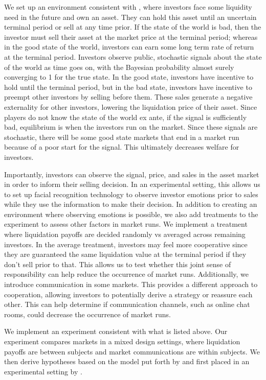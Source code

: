 \documentclass[11pt]{article}
\begin{document}
We set up an environment consistent with \cite{bernardo2004liquidity}, where investors face some liquidity need in the future and own an asset. They can hold this asset until an uncertain terminal period or sell at any time prior. If the state of the world is bad, then the investor must sell their asset at the market price at the terminal period; whereas in the good state of the world, investors can earn some long term rate of return at the terminal period. Investors observe public, stochastic signals about the state of the world as time goes on, with the Bayesian probability almost surely converging to 1 for the true state. In the good state, investors have incentive to hold until the terminal period, but in the bad state, investors have incentive to preempt other investors by selling before them. These sales generate a negative externality for other investors, lowering the liquidation price of their asset. Since players do not know the state of the world ex ante, if the signal is sufficiently bad, equilibrium is when the investors run on the market. Since these signals are stochastic, there will be some good state markets that end in a market run because of a poor start for the signal. This ultimately decreases welfare for investors. %

Importantly, investors can observe the signal, price, and sales in the asset market in order to inform their selling decision. In an experimental setting, this allows us to set up facial recognition technology to observe investor emotions prior to sales while they use the information to make their decision. In addition to creating an environment where observing emotions is possible, we also add treatments to the experiment to assess other factors in market runs. We implement a treatment where liquidation payoffs are decided randomly vs averaged across remaining investors. In the average treatment, investors may feel more cooperative since they are guaranteed the same liquidation value at the terminal period if they don't sell prior to that. This allows us to test whether this joint sense of responsibility can help reduce the occurrence of market runs. Additionally, we introduce communication in some markets. This provides a different approach to cooperation, allowing investors to potentially derive a strategy or reassure each other. This can help determine if communication channels, such as online chat rooms, could decrease the occurrence of market runs.

We implement an experiment consistent with what is listed above. Our experiment compares markets in a mixed design settings, where liquidation payoffs are between subjects and market communications are within subjects. We then derive hypotheses based on the model put forth by \cite{bernardo2004liquidity} and first placed in an experimental setting by \cite{magnani2020dynamic}.
\end{document}
